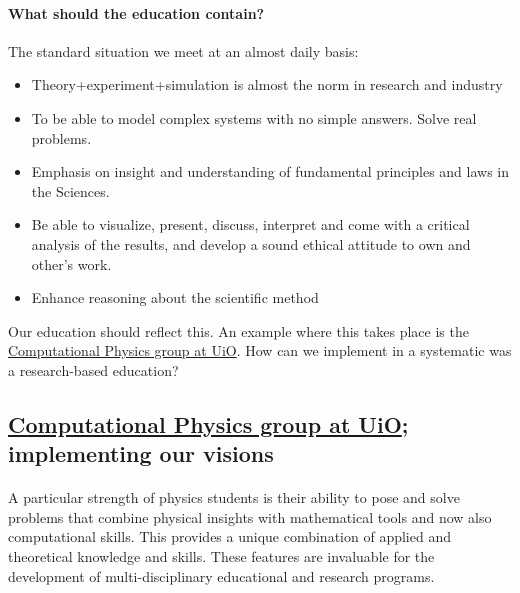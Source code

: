 \documentclass[%
oneside,                 %
final,                   %
10pt]{article}
\begin{document}
\paragraph{What should the education contain?}
The standard situation we meet at an almost daily basis:

\begin{itemize}
\item Theory+experiment+simulation is almost the norm in research and industry

\item To be able to model complex systems with no simple answers. Solve real problems.

\item Emphasis on insight and understanding of fundamental principles and laws in the Sciences.

\item Be able to visualize, present, discuss, interpret and come with a critical analysis of the results, and develop a sound ethical attitude to own and other's work.

\item Enhance reasoning about the scientific method
\end{itemize}

\noindent
Our education should reflect this. An example where this takes place is the \href{{http://www.mn.uio.no/fysikk/english/research/groups/computational/index.html}}{Computational Physics group at UiO}.  How can we implement in a systematic was a research-based education?




\subsection{\href{{http://www.mn.uio.no/fysikk/english/research/groups/computational/index.html}}{Computational Physics group at UiO}; implementing our visions}

\paragraph{}
A particular strength of physics students is their ability to pose and
solve problems that combine physical insights with mathematical tools
and now also computational skills. This provides a unique combination
of applied and theoretical knowledge and skills. These features are invaluable 
for the development of multi-disciplinary educational and research programs.
\end{document}
